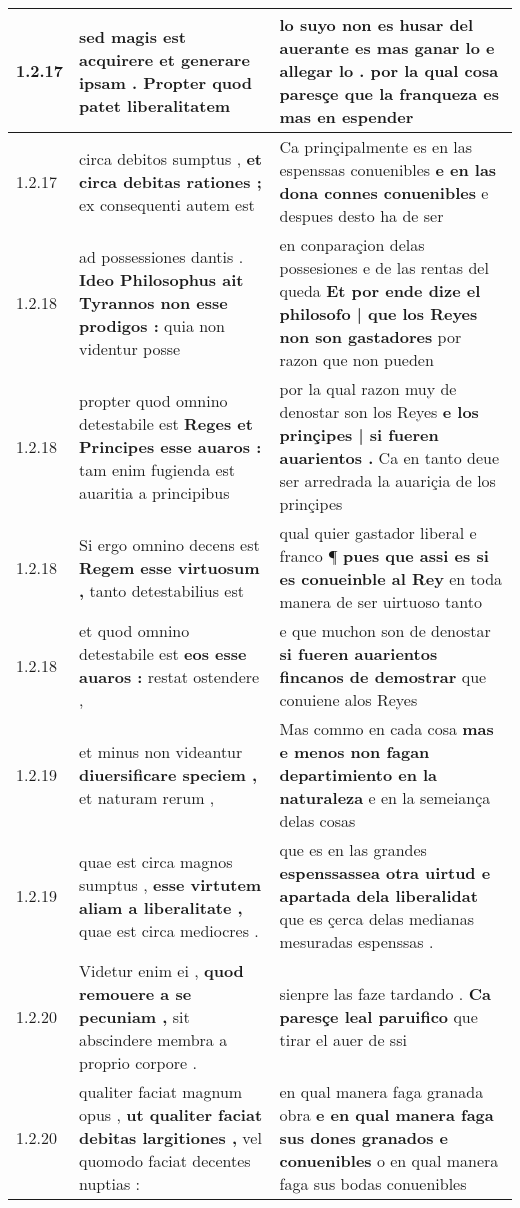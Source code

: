 \begin{tabular}{|p{1cm}|p{6.5cm}|p{6.5cm}|}
1.2.17 & sed magis est acquirere \textbf{ et generare ipsam . } Propter quod patet liberalitatem & lo suyo non es husar del auerante es mas ganar lo e allegar lo . \textbf{ por la qual cosa paresçe } que la franqueza es mas en espender \\\hline
1.2.17 & circa debitos sumptus , \textbf{ et circa debitas rationes ; } ex consequenti autem est & Ca prinçipalmente es en las espenssas conuenibles \textbf{ e en las dona connes conuenibles } e despues desto ha de ser \\\hline
1.2.18 & ad possessiones dantis . \textbf{ Ideo Philosophus ait Tyrannos non esse prodigos : } quia non videntur posse & en conparaçion delas possesiones e de las rentas del queda \textbf{ Et por ende dize el philosofo | que los Reyes non son gastadores } por razon que non pueden \\\hline
1.2.18 & propter quod omnino detestabile est \textbf{ Reges et Principes esse auaros : } tam enim fugienda est auaritia a principibus & por la qual razon muy de denostar son los Reyes \textbf{ e los prinçipes | si fueren auarientos . } Ca en tanto deue ser arredrada la auariçia de los prinçipes \\\hline
1.2.18 & Si ergo omnino decens est \textbf{ Regem esse virtuosum , } tanto detestabilius est & qual quier gastador liberal e franco ¶ \textbf{ pues que assi es si es conueinble al Rey } en toda manera de ser uirtuoso tanto \\\hline
1.2.18 & et quod omnino detestabile est \textbf{ eos esse auaros : } restat ostendere , & e que muchon son de denostar \textbf{ si fueren auarientos fincanos de demostrar } que conuiene alos Reyes \\\hline
1.2.19 & et minus non videantur \textbf{ diuersificare speciem , } et naturam rerum , & Mas commo en cada cosa \textbf{ mas e menos non fagan departimiento en la naturaleza } e en la semeiança delas cosas \\\hline
1.2.19 & quae est circa magnos sumptus , \textbf{ esse virtutem aliam a liberalitate , } quae est circa mediocres . & que es en las grandes \textbf{ espenssassea otra uirtud e apartada dela liberalidat } que es çerca delas medianas mesuradas espenssas . \\\hline
1.2.20 & Videtur enim ei , \textbf{ quod remouere a se pecuniam , } sit abscindere membra a proprio corpore . & sienpre las faze tardando . \textbf{ Ca paresçe leal paruifico } que tirar el auer de ssi \\\hline
1.2.20 & qualiter faciat magnum opus , \textbf{ ut qualiter faciat debitas largitiones , } vel quomodo faciat decentes nuptias : & en qual manera faga granada obra \textbf{ e en qual manera faga sus dones granados e conuenibles } o en qual manera faga sus bodas conuenibles \\\hline

\end{tabular}

